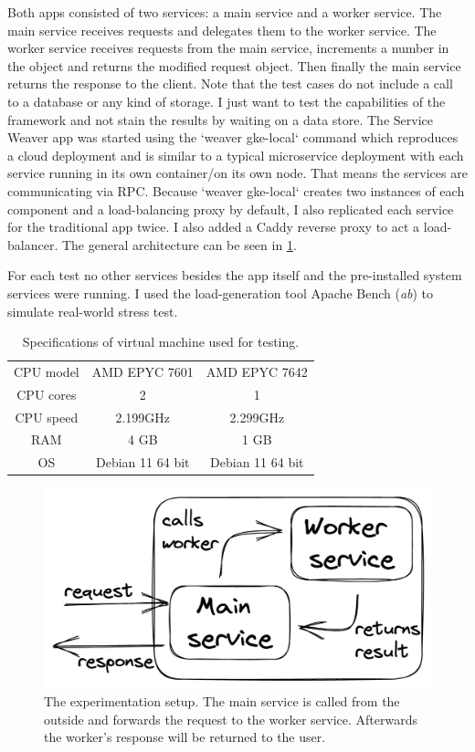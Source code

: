 \documentclass[sigconf,review,9pt]{acmart}
\begin{document}
Both apps consisted of two services: a main service and a worker service.
The main service receives requests and delegates them to the worker service.
The worker service receives requests from the main service, increments a number in the object
and returns the modified request object.
Then finally the main service returns the response to the client.
Note that the test cases do not include a call to a database or any kind of storage.
I just want to test the capabilities of the framework and not stain the results by
waiting on a data store.
The Service Weaver app was started using the `weaver gke-local` command which reproduces a
cloud deployment and is similar to a typical microservice deployment with each service running in
its own container/on its own node.
That means the services are communicating via RPC.
Because `weaver gke-local` creates two instances of each component and a load-balancing
proxy by default, I also replicated each service for the traditional app twice.
I also added a Caddy \cite{serverCaddyUltimateServer} reverse proxy to act a load-balancer.
The general architecture can be seen in \ref{fig:architecture}.

For each test no other services besides the app itself and the pre-installed system services were running.
I used the load-generation tool Apache Bench (\emph{ab}) \cite{ApacheHTTPServer} to simulate
real-world stress test.


\begin{table}
	\caption{Specifications of virtual machine used for testing.}
	\label{tab:linode}
	\begin{tabular}{ccc}
		\toprule
		CPU model & AMD EPYC 7601    & AMD EPYC 7642    \\
		CPU cores & 2                & 1                \\
		CPU speed & 2.199GHz         & 2.299GHz         \\
		RAM       & 4 GB             & 1 GB             \\
		OS        & Debian 11 64 bit & Debian 11 64 bit
	\end{tabular}
\end{table}


\begin{figure}
	\includegraphics[width=\columnwidth]{setup}
	\caption{The experimentation setup. The main service is called from the outside and
		forwards the request to the worker service.
		Afterwards the worker's response will be returned to the user.}
	\label{fig:architecture}
\end{figure}
\end{document}
